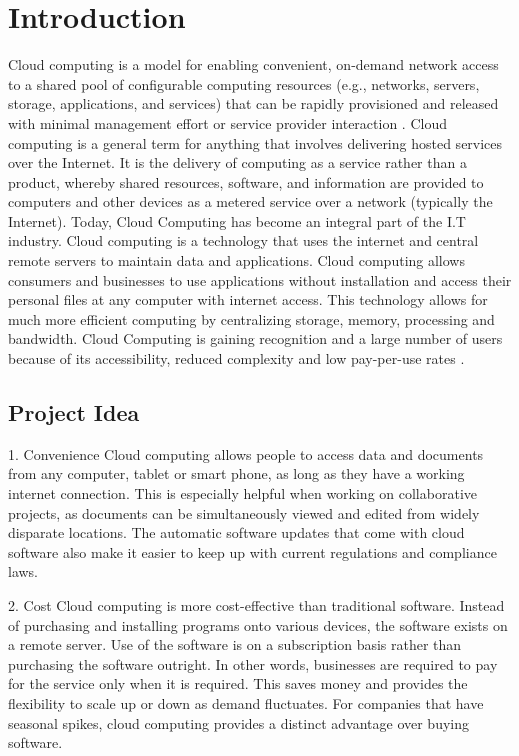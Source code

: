 \chapter{Introduction}

Cloud computing is a model for enabling convenient, on-demand network access to a shared pool of configurable computing resources (e.g., networks, servers, storage, applications, and services) that can be rapidly provisioned and released with minimal management effort or service provider interaction . Cloud computing is a general term for anything that involves delivering hosted services over the Internet. It is the delivery of computing as a service rather than a product, whereby shared resources, software, and information are provided to computers and other devices as a metered service over a network (typically the Internet). 
  Today, Cloud Computing has become an integral part of the I.T industry. Cloud computing is a technology that uses the internet and central remote servers to maintain data and applications. Cloud computing allows consumers and businesses to use applications without installation and access their personal files at any computer with internet access. This technology allows for much more efficient computing by centralizing storage, memory, processing and bandwidth. Cloud Computing is gaining recognition and a large number of users because of its accessibility, reduced complexity and low pay-per-use rates .

\section{Project Idea}


1.  Convenience Cloud computing allows people to access data and documents from any computer, tablet or smart phone, as long as they have a working internet connection. This is especially helpful when working on collaborative projects, as documents can be simultaneously viewed and edited from widely disparate locations. The automatic software updates that come with cloud software also make it easier to keep up with current regulations and compliance laws.

2. Cost Cloud computing is more cost-effective than traditional software. Instead of purchasing and installing programs onto various devices, the software exists on a remote server. Use of the software is on a subscription basis rather than purchasing the software outright. In other words, businesses are required to pay for the service only when it is required. This saves money and provides the flexibility to scale up or down as demand fluctuates. For companies that have seasonal spikes, cloud computing provides a distinct advantage over buying software.

